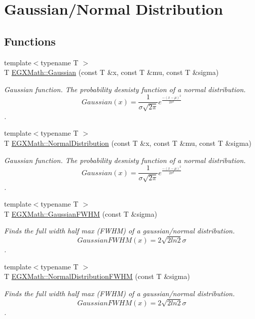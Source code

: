 \hypertarget{group___e_g_x_math-_functions-_gaussian}{}\section{Gaussian/\+Normal Distribution}
\label{group___e_g_x_math-_functions-_gaussian}
\subsection*{Functions}
\begin{DoxyCompactItemize}
\item 
{\footnotesize template$<$typename T $>$ }\\T \mbox{\hyperlink{group___e_g_x_math-_functions-_gaussian_ga647b46315081e299edc16a1c7f4e4032}{E\+G\+X\+Math\+::\+Gaussian}} (const T \&x, const T \&mu, const T \&sigma)
\begin{DoxyCompactList}\small\item\em Gaussian function. The probability desnisty function of a normal distribution. \[ Gaussian(x)=\frac{1}{\sigma \sqrt{2\pi}}e^{\frac{-(x-\mu)^2}{2\sigma^2}} \]. \end{DoxyCompactList}\item 
{\footnotesize template$<$typename T $>$ }\\T \mbox{\hyperlink{group___e_g_x_math-_functions-_gaussian_ga3747a7d047293d0e5310ba112bece627}{E\+G\+X\+Math\+::\+Normal\+Distribution}} (const T \&x, const T \&mu, const T \&sigma)
\begin{DoxyCompactList}\small\item\em Gaussian function. The probability desnisty function of a normal distribution. \[Gaussian(x)=\frac{1}{\sigma \sqrt{2\pi}}e^{\frac{-(x-\mu)^2}{2\sigma^2}}\]. \end{DoxyCompactList}\item 
{\footnotesize template$<$typename T $>$ }\\T \mbox{\hyperlink{group___e_g_x_math-_functions-_gaussian_ga0b8be7b82cb82e871a2613e6a7180431}{E\+G\+X\+Math\+::\+Gaussian\+F\+W\+HM}} (const T \&sigma)
\begin{DoxyCompactList}\small\item\em Finds the full width half max (F\+W\+HM) of a gaussian/normal distribution. \[GaussianFWHM(x)=2\sqrt{2 ln 2} \sigma \]. \end{DoxyCompactList}\item 
{\footnotesize template$<$typename T $>$ }\\T \mbox{\hyperlink{group___e_g_x_math-_functions-_gaussian_gac537b8c525932979b28101cf432bcc0f}{E\+G\+X\+Math\+::\+Normal\+Distribution\+F\+W\+HM}} (const T \&sigma)
\begin{DoxyCompactList}\small\item\em Finds the full width half max (F\+W\+HM) of a gaussian/normal distribution. \[GaussianFWHM(x)=2\sqrt{2 ln 2} \sigma \]. \end{DoxyCompactList}\end{DoxyCompactItemize}


